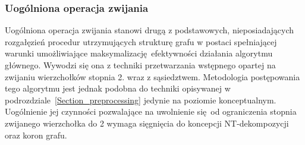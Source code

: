 \subsubsection{\textbf{Uogólniona operacja zwijania}}\label{sss_ckx_general_fold}
\par{
  Uogólniona operacja zwijania stanowi drugą z podstawowych, nieposiadających rozgałęzień procedur utrzymujących strukturę grafu w postaci spełniającej warunki umożliwiające maksymalizację efektywności działania algorytmu głównego.
  Wywodzi się ona z techniki przetwarzania wstępnego opartej na zwijaniu wierzchołków stopnia 2. wraz z sąsiedztwem.
  Metodologia postępowania tego algorytmu jest jednak podobna do techniki opisywanej w podrozdziale~\ref{Section_preprocessing} jedynie na poziomie konceptualnym.
  Uogólnienie jej czynności pozwalające na uwolnienie się od ograniczenia stopnia zwijanego wierzchołka do 2 wymaga sięgnięcia do koncepcji NT-dekompozycji oraz koron grafu.
}
